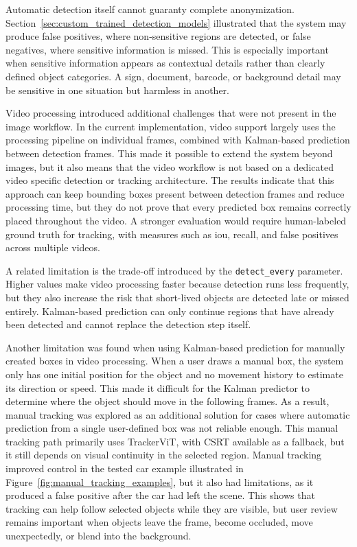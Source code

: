 Automatic detection itself cannot guaranty complete \gls{anonymization}. Section~\ref{sec:custom_trained_detection_models} illustrated that the system may produce \gls{false positive}s, where non-sensitive regions are detected, or \gls{false negative}s, where sensitive information is missed. This is especially important
when sensitive information appears as contextual details rather than clearly defined object categories. A sign, document, barcode, or background detail may be sensitive in one situation but harmless in another.

Video processing introduced additional challenges that were not present in the image workflow. In the current implementation, video support largely uses the processing pipeline on individual frames, combined with Kalman-based prediction between detection frames. This made it possible to extend the system beyond images, but it also means that the video workflow is not based on a dedicated video specific detection or tracking
architecture. The results indicate that this approach can keep \gls{bounding box}es present between detection frames and reduce processing time, but they do not prove that every predicted box remains correctly placed throughout the video. A stronger evaluation would require human-labeled ground truth for tracking, with measures such as \acrshort{iou}, recall, and \gls{false positive}s across multiple videos.

A related limitation is the trade-off introduced by the
\texttt{detect\_every} parameter. Higher values make video processing faster because detection runs less frequently, but they also increase the risk that short-lived objects are detected late or missed entirely. Kalman-based prediction can only continue regions that have already been detected and cannot
replace the detection step itself.

Another limitation was found when using Kalman-based prediction for manually created boxes in video processing. When a user draws a manual box, the system only has one initial position for the object and no movement history to estimate its direction or speed. This made it difficult for the Kalman predictor to determine where the object should move in the following frames. As a result, manual tracking was explored as an additional solution for cases where automatic prediction from a single user-defined box was not reliable enough. This manual tracking path primarily uses TrackerViT, with CSRT available as a fallback, but it still depends on visual continuity in the selected region. Manual tracking improved control in the tested car example illustrated in Figure~\ref{fig:manual_tracking_examples}, but it also had limitations, as it produced a \gls{false positive} after the car had left the scene. This shows that tracking can help follow selected objects while they are visible, but user review remains important when objects leave the frame, become occluded, move unexpectedly, or blend into the background.

